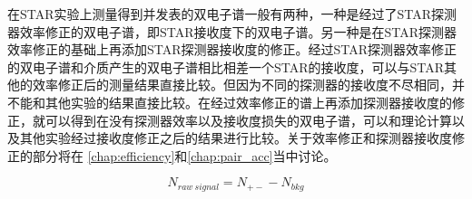 在STAR实验上测量得到并发表的双电子谱一般有两种，一种是经过了STAR探测器效率修正的双电子谱，即STAR接收度下的双电子谱。另一种是在STAR探测器效率修正的基础上再添加STAR探测器接收度的修正。经过STAR探测器效率修正的双电子谱和介质产生的双电子谱相比相差一个STAR的接收度，可以与STAR其他的效率修正后的测量结果直接比较。但因为不同的探测器的接收度不尽相同，并不能和其他实验的结果直接比较。在经过效率修正的谱上再添加探测器接收度的修正，就可以得到在没有探测器效率以及接收度损失的双电子谱，可以和理论计算以及其他实验经过接收度修正之后的结果进行比较。关于效率修正和探测器接收度修正的部分将在 \ref{chap:efficiency}和\ref{chap:pair_acc}当中讨论。

\begin{equation}
  \label{eq:raw_signal}
  N_{raw~signal} = N_{+-}-N_{bkg}
\end{equation}